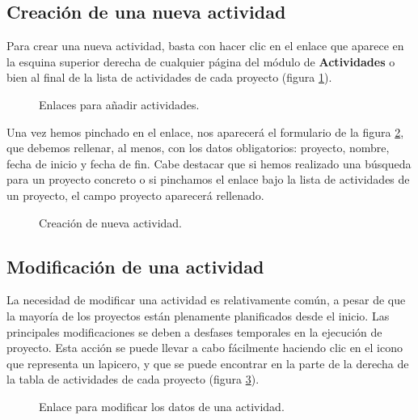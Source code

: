 \subsection{Creación de una nueva actividad}

Para crear una nueva actividad, basta con hacer clic en el enlace que aparece en
la esquina superior derecha de cualquier página del módulo de
\textbf{Actividades} o bien al final de la lista de actividades de cada
proyecto (figura \ref{fig:aniadir_actividad}).

\begin{figure}
\centering
{}
\caption{Enlaces para añadir actividades.}
\label{fig:aniadir_actividad}
\end{figure}

Una vez hemos pinchado en el enlace, nos aparecerá el formulario de la figura
\ref{fig:form_actividad}, que debemos rellenar, al menos, con los datos
obligatorios: proyecto, nombre, fecha de inicio y fecha de fin. Cabe destacar
que si hemos realizado una búsqueda para un proyecto concreto o si pinchamos el
enlace bajo la lista de actividades de un proyecto, el campo proyecto
aparecerá rellenado.

\begin{figure}
\centering
{}
\caption{Creación de nueva actividad.}
\label{fig:form_actividad}
\end{figure}


\subsection{Modificación de una actividad}

La necesidad de modificar una actividad es relativamente común, a pesar de que
la mayoría de los proyectos están plenamente planificados desde el inicio. Las
principales modificaciones se deben a desfases temporales en la ejecución de
proyecto. Esta acción se puede llevar a cabo fácilmente haciendo clic en el
icono que representa un lapicero, y que se puede encontrar en la parte de la
derecha de la tabla de actividades de cada proyecto (figura
\ref{fig:mod_actividad}).

\begin{figure}
\centering
{}
\caption{Enlace para modificar los datos de una actividad.}
\label{fig:mod_actividad}
\end{figure}

